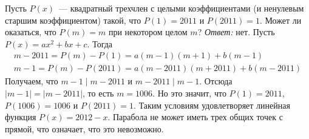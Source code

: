 \problem
Пусть $P(x)$~--- квадратный трехчлен с целыми коэффициентами
(и ненулевым старшим коэффициентом) такой, что $P(1) = 2011$ и $P(2011) = 1$.
Может ли оказаться, что $P(m) = m$ при некотором целом $m$?
\solution
\emph{Ответ:} нет.
Пусть $P(x) = a x^2 + b x + c$.
Тогда
\begin{gather*}
    m - 2011 = P(m) - P(1) = a (m - 1) (m + 1) + b (m - 1)
\\
    m - 1 = P(m) - P(2011) = a (m - 2011) (m + 2011) + b (m - 2011)
\end{gather*}
Получаем, что $m - 1 \mid m - 2011$ и $m - 2011 \mid m - 1$.
Отсюда $|m - 1| = |m - 2011|$, то есть $m = 1006$.
Но это значит, что
$P(1) = 2011$, $P(1006) = 1006$ и $P(2011) = 1$.
Таким условиям удовлетворяет линейная функция $P(x) = 2012 - x$.
Парабола не может иметь трех общих точек с прямой, что означает, что это
невозможно.
\endproblem
